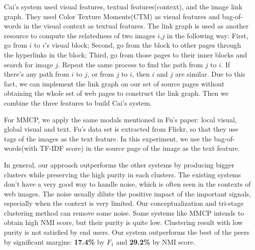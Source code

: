Cai's system used visual features, textual features(context), and the image link graph.
They used Color Texture Moments(CTM)\cite{Yu03colortexture} as visual features and bag-of-words in the visual context
as textual features.
The link graph is used as another resource to compute the relatedness of
two images $i$,$j$ in the following way: First, go from $i$ to $i$'s visual block; Second, go
from the block to other pages through the hyperlinks in the block; Third, go from those
pages to their inner blocks and search for image $j$. Repeat the same process to find the
path from $j$ to $i$. If there's any path from $i$ to $j$, or from $j$ to $i$, then $i$ and $j$ are
similar. Due to this fact, we can implement the link graph on our set of source pages
without obtaining the whole set of web pages to construct the link graph. Then we combine
the three features to build Cai's system.


For MMCP, we apply the same modals mentioned in Fu's paper: local visual, global visual
and text. Fu's data set is extracted from Flickr, so that they use tags of
the images as the text feature. In this experiment, we use the bag-of-words(with TF-IDF score)
in the source page of the image as the text feature.

In general, our approach outperforms the other systems by
producing bigger clusters while preserving
the high purity in each clusters. The existing systems don't have
a very good way to handle noise, which is often seen in the contexts of
web images. The noise usually dilute the positive impact of the important
signals, especially when the context is very limited. Our conceptualization
and tri-stage clustering method can remove some noise.
Some systems like MMCP intends to obtain high NMI score,
but their purity is quite low. Clustering result with low purity is
not satisfied by end users. Our system outperforms the best of the peers
by significant margins: {\bf 17.4\%} by $F_1$ and {\bf 29.2\%} by NMI score.

